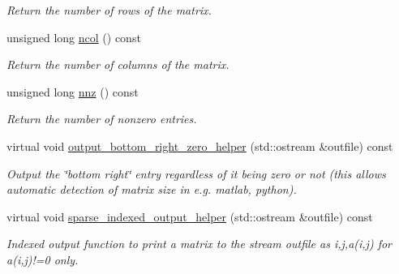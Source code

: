 \begin{DoxyCompactItemize}
\begin{DoxyCompactList}\small\item\em Return the number of rows of the matrix. \end{DoxyCompactList}\item 
unsigned long \hyperlink{classoomph_1_1SparseMatrix_a4db71b6d794cfcee1624c15c09d62d7f}{ncol} () const
\begin{DoxyCompactList}\small\item\em Return the number of columns of the matrix. \end{DoxyCompactList}\item 
unsigned long \hyperlink{classoomph_1_1SparseMatrix_a8b8010edcc0869283621e72a9bbc51e3}{nnz} () const
\begin{DoxyCompactList}\small\item\em Return the number of nonzero entries. \end{DoxyCompactList}\item 
virtual void \hyperlink{classoomph_1_1SparseMatrix_a4c638f36db786e159565e1f890402ed2}{output\+\_\+bottom\+\_\+right\+\_\+zero\+\_\+helper} (std\+::ostream \&outfile) const
\begin{DoxyCompactList}\small\item\em Output the \char`\"{}bottom right\char`\"{} entry regardless of it being zero or not (this allows automatic detection of matrix size in e.\+g. matlab, python). \end{DoxyCompactList}\item 
virtual void \hyperlink{classoomph_1_1SparseMatrix_a84a08f7e77be50af6a5655cbe0609619}{sparse\+\_\+indexed\+\_\+output\+\_\+helper} (std\+::ostream \&outfile) const
\begin{DoxyCompactList}\small\item\em Indexed output function to print a matrix to the stream outfile as i,j,a(i,j) for a(i,j)!=0 only. \end{DoxyCompactList}\end{DoxyCompactItemize}
